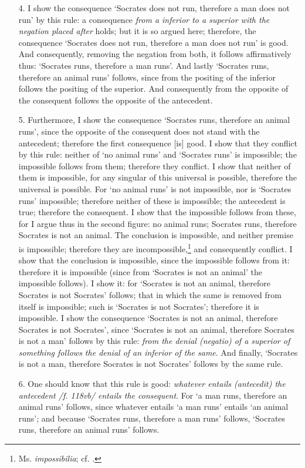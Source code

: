 \begin{enumerate}
\item[4.] I show the consequence `Socrates does not run, therefore a man does not run' by this rule: a consequence \textit{from a inferior to a superior with the negation placed after} holds; but it is so argued here; therefore, the consequence `Socrates does not run, therefore a man does not run' is good. And consequently, removing the negation from both, it follows affirmatively thus: `Socrates runs, therefore a man runs'. And lastly `Socrates runs, therefore an animal runs' follows, since from the positing of the inferior follows the positing of the superior. And consequently from the opposite of the consequent follows the opposite of the antecedent.
\item[5.] Furthermore, I show the consequence `Socrates runs, therefore an animal runs', since the opposite of the consequent does not stand with the antecedent; therefore the first consequence [is] good. I show that they conflict by this rule: neither of `no animal runs' and `Socrates runs' is impossible; the impossible follows from them; therefore they conflict. I show that neither of them is impossible, for any singular of this universal is possible, therefore the universal is possible. For `no animal runs' is not impossible, nor is `Socrates runs' impossible; therefore neither of these is impossible; the antecedent is true; therefore the consequent. I show that the impossible follows from these, for I argue thus in the second figure: no animal runs; Socrates runs, therefore Socrates is not an animal. The conclusion is impossible, and neither premise is impossible; therefore they are incompossible,\footnote{Ms. \textit{impossibilia}; cf. \cite[p. 155, par. 151]{Green-Pedersen1980b}.} and consequently conflict. I show that the conclusion is impossible, since the impossible follows from it: therefore it is impossible (since from `Socrates is not an animal' the impossible follows). I show it: for `Socrates is not an animal, therefore Socrates is not Socrates' follows; that in which the same is removed from itself is impossible; such is `Socrates is not Socrates'; therefore it is impossible. I show the consequence `Socrates is not an animal, therefore Socrates is not Socrates', since `Socrates is not an animal, therefore Socrates is not a man' follows by this rule: \textit{from the denial (negatio) of a superior of something follows the denial of an inferior of the same}. And finally, `Socrates is not a man, therefore Socrates is not Socrates' follows by the same rule.
\item[6.] One should know that this rule is good: \textit{whatever entails (antecedit) the antecedent /f. 118vb/ entails the consequent}. For `a man runs, therefore an animal runs' follows, since whatever entails `a man runs' entails `an animal runs'; and because `Socrates runs, therefore a man runs' follows, `Socrates runs, therefore an animal runs' follows.

\end{enumerate}
